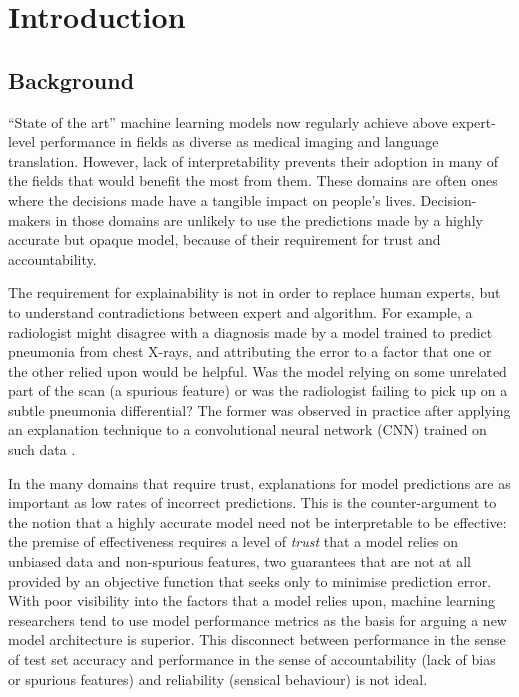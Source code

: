 \documentclass[main]{subfiles}
\begin{document}
\chapter{Introduction}

\section{Background} \label{sec:background}

``State of the art'' machine learning models now regularly achieve above expert-level performance in fields as diverse as medical imaging and language translation. However, lack of interpretability prevents their adoption in many of the fields that would benefit the most from them. These domains are often ones where the decisions made have a tangible impact on people's lives. Decision-makers in those domains are unlikely to use the predictions made by a highly accurate but opaque model, because of their requirement for trust and accountability. 

The requirement for explainability is not in order to replace human experts, but to understand contradictions between expert and algorithm. For example, a radiologist might disagree with a diagnosis made by a model trained to predict pneumonia from chest X-rays, and attributing the error to a factor that one or the other relied upon would be helpful. Was the model relying on some unrelated part of the scan (a spurious feature) or was the radiologist failing to pick up on a subtle pneumonia differential? The former was observed in practice after applying an explanation technique to a convolutional neural network (CNN) trained on such data \cite{xray}. 

In the many domains that require trust, explanations for model predictions are as important as low rates of incorrect predictions. This is the counter-argument to the notion that a highly accurate model need not be interpretable to be effective: the premise of effectiveness requires a level of \textit{trust} that a model relies on unbiased data and non-spurious features, two guarantees that are not at all provided by an objective function that seeks only to minimise prediction error. With poor visibility into the factors that a model relies upon, machine learning researchers tend to use model performance metrics as the basis for arguing a new model architecture is superior. This disconnect between performance in the sense of test set accuracy and performance in the sense of accountability (lack of bias or spurious features) and reliability (sensical behaviour) is not ideal.
\end{document}
